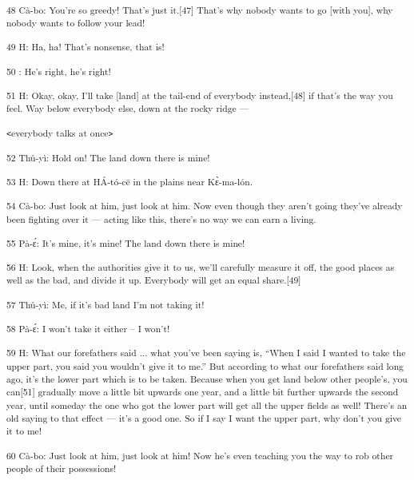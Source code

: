 {\textsuperscript{48 Cà-bo: You're so greedy! That's just it.[47] That's
why nobody wants to go [with you], why nobody wants to follow your lead! }}

{\textsuperscript{49 H: Ha, ha! That's nonsense, that is!}}

{\textsuperscript{50      : He's right, he's right!}}

{\textsuperscript{51 H: Okay, okay, I'll take [land] at the tail-end of
everybody instead,[48] if that's the way you feel. Way below everybody else, down
at the rocky ridge --- }}

{\textsuperscript{\texttt{<}everybody talks at once\texttt{>}}}

{\textsuperscript{52 Thû-yì: Hold on! The land down there is mine!}}

{\textsuperscript{53 H: Down there at HÁ-tó-cē in the plains near Kɛ̀-ma-lón.}}

{\textsuperscript{54 Cà-bo: Just look at him, just look at him. Now even
though they aren't going they've already been fighting over it --- acting like
this, there's no way we can earn a living.}}

{\textsuperscript{55 Pà-ɛ́: It's mine, it's mine! The land down there
is mine! }}

{\textsuperscript{56 H: Look, when the authorities give it to us, we'll
carefully measure it off, the good places as well as the bad, and divide it up.
Everybody will get an equal share.[49]}}

{\textsuperscript{57 Thû-yì: Me, if it's bad land I'm not taking it!}}

{\textsuperscript{58 Pà-ɛ́: I won't take it either -- I won't!}}

{\textsuperscript{59 H: What our forefathers said ... what you've been saying
is, ``When I said I wanted to take the upper part, you said you wouldn't give it
to me.'' But according to what our forefathers said long ago, it's the lower part
which is to be taken. Because when you get land below other people's, you can[51]
gradually move a little bit upwards one year, and a little bit further upwards
the second year, until someday the one who got the lower part will get all the
upper fields as well! There's an old saying to that effect --- it's a good one.
So if I say I want the upper part, why don't you give it to me!}}

{\textsuperscript{60 Cà-bo: Just look at him, just look at him! Now he's
even teaching you the way to rob other people of their possessions!}}


